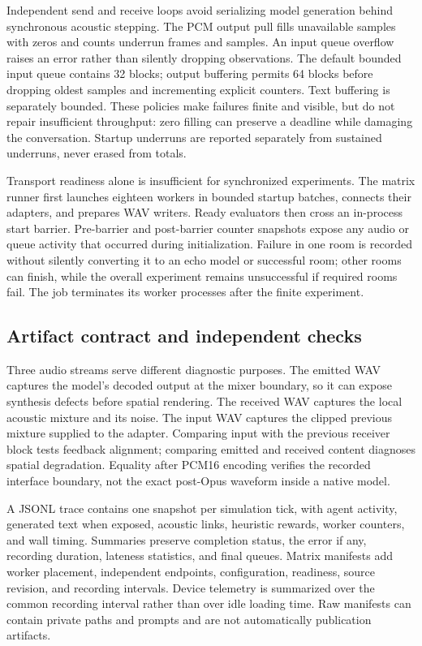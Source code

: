 \documentclass{article}
\begin{document}
Independent send and receive loops avoid serializing model generation behind synchronous acoustic stepping. The PCM output pull fills unavailable samples with zeros and counts underrun frames and samples. An input queue overflow raises an error rather than silently dropping observations. The default bounded input queue contains 32 blocks; output buffering permits 64 blocks before dropping oldest samples and incrementing explicit counters. Text buffering is separately bounded. These policies make failures finite and visible, but do not repair insufficient throughput: zero filling can preserve a deadline while damaging the conversation. Startup underruns are reported separately from sustained underruns, never erased from totals.

Transport readiness alone is insufficient for synchronized experiments. The matrix runner first launches eighteen workers in bounded startup batches, connects their adapters, and prepares WAV writers. Ready evaluators then cross an in-process start barrier. Pre-barrier and post-barrier counter snapshots expose any audio or queue activity that occurred during initialization. Failure in one room is recorded without silently converting it to an echo model or successful room; other rooms can finish, while the overall experiment remains unsuccessful if required rooms fail. The job terminates its worker processes after the finite experiment.

\subsection{Artifact contract and independent checks}
Three audio streams serve different diagnostic purposes. The emitted WAV captures the model's decoded output at the mixer boundary, so it can expose synthesis defects before spatial rendering. The received WAV captures the local acoustic mixture and its noise. The input WAV captures the clipped previous mixture supplied to the adapter. Comparing input with the previous receiver block tests feedback alignment; comparing emitted and received content diagnoses spatial degradation. Equality after PCM16 encoding verifies the recorded interface boundary, not the exact post-Opus waveform inside a native model.

A JSONL trace contains one snapshot per simulation tick, with agent activity, generated text when exposed, acoustic links, heuristic rewards, worker counters, and wall timing. Summaries preserve completion status, the error if any, recording duration, lateness statistics, and final queues. Matrix manifests add worker placement, independent endpoints, configuration, readiness, source revision, and recording intervals. Device telemetry is summarized over the common recording interval rather than over idle loading time. Raw manifests can contain private paths and prompts and are not automatically publication artifacts.
\end{document}
